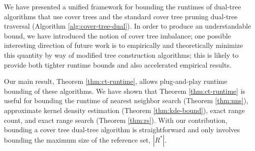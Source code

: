 We have presented a unified framework for bounding the runtimes of dual-tree
algorithms that use cover trees and the standard cover tree pruning dual-tree
traversal (Algorithm \ref{alg:cover-tree-dual}).  In order to produce an
understandable bound, we have introduced the notion of cover tree imbalance; one
possible interesting direction of future work is to empirically and
theoretically minimize this quantity by way of modified tree construction
algorithms; this is likely to provide both tighter runtime bounds and also
accelerated empirical results.

Our main result, Theorem \ref{thm:ct-runtime}, allows plug-and-play runtime
bounding of these algorithms.  We have shown that Theorem \ref{thm:ct-runtime}
is useful for bounding the runtime of nearest neighbor search (Theorem
\ref{thm:nns}), approximate kernel density estimation (Theorem
\ref{thm:kde-bound}), exact range count, and exact range search (Theorem
\ref{thm:rs}).  With our contribution, bounding a cover tree dual-tree algorithm
is straightforward and only involves bounding the maximum size of the reference
set, $| R^* |$.
